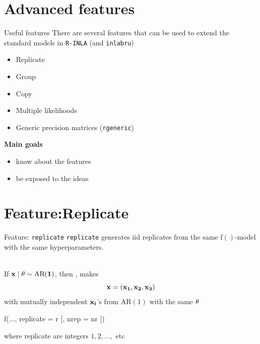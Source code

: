 \documentclass[
  ignorenonframetext,
]{beamer}
\newenvironment{Shaded}{\begin{snugshade}}{\end{snugshade}}
\newcommand{\AttributeTok}[1]{\textcolor[rgb]{0.77,0.63,0.00}{#1}}
\newcommand{\FunctionTok}[1]{\textcolor[rgb]{0.00,0.00,0.00}{#1}}
\newcommand{\NormalTok}[1]{#1}
\providecommand{\tightlist}{%
  \setlength{\itemsep}{0pt}\setlength{\parskip}{0pt}}
\begin{document}
\hypertarget{advanced-features}{%
\section{Advanced features}\label{advanced-features}}

\begin{frame}[fragile]{Useful features}
\protect\hypertarget{useful-features}{}
There are several features that can be used to extend the standard
models in \texttt{R-INLA} (and \texttt{inlabru})

\begin{itemize}
\item
  Replicate
\item
  Group
\item
  Copy
\item
  Multiple likelihoods
\item
  Generic precision matrices (\texttt{rgeneric})
\end{itemize}

\textbf{Main goals}

\begin{itemize}
\tightlist
\item
  know about the features
\item
  be exposed to the ideas
\end{itemize}
\end{frame}

\hypertarget{featurereplicate}{%
\section{Feature:Replicate}\label{featurereplicate}}

\begin{frame}[fragile]{Feature: \texttt{replicate}}
\protect\hypertarget{feature-replicate}{}
\texttt{replicate} generates iid replicates from the same f\(()\)-model
with the same hyperparameters.\\
\strut \\
If \(\bf{x}\mid\bf{\theta} \sim \text{AR}(1)\), then ,
makes \[
\bf{x} = ({\bf x}_{1}, {\bf x}_{2}, {\bf x}_{3})
\] with mutually independent \(\bf{x}_{i}\)'s from AR\((1)\) with the
same \(\bf{\theta}\)

\begin{Shaded}
\begin{Highlighting}[]
    \FunctionTok{f}\NormalTok{(..., }\AttributeTok{replicate =}\NormalTok{ r [, }\AttributeTok{nrep =}\NormalTok{ nr ])}
\end{Highlighting}
\end{Shaded}

where replicate are integers \(1, 2, \ldots,\) etc
\end{frame}
\end{document}
